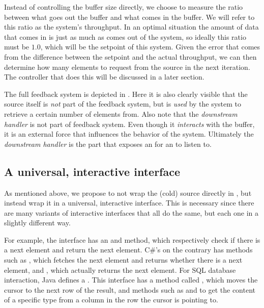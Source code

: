 Instead of controlling the buffer size directly, we choose to measure the ratio between what goes out the buffer and what comes in the buffer. We will refer to this ratio as the system's throughput. In an optimal situation the amount of data that comes in is just as much as comes out of the system, so ideally this ratio must be $1.0$, which will be the setpoint of this system. Given the error that comes from the difference between the setpoint and the actual throughput, we can then determine how many elements to request from the source in the next iteration. The controller that does this will be discussed in a later section.

The full feedback system is depicted in . Here it is also clearly visible that the source itself is \emph{not} part of the feedback system, but is \emph{used} by the system to retrieve a certain number of elements from. Also note that the \textit{downstream handler} is not part of feedback system. Even though it \emph{interacts} with the buffer, it is an external force that influences the behavior of the system. Ultimately the \textit{downstream handler} is the part that exposes an \obs for an \obv to listen to.



\subsection{A universal, interactive interface}
As mentioned above, we propose to not wrap the (cold) source directly in , but instead wrap it in a universal, interactive interface. This is necessary since there are many variants of interactive interfaces that all do the same, but each one in a slightly different way.

For example, the \itr interface has an  and  method, which respectively check if there is a next element and return the next element. C\#'s \ier on the contrary has methods such as , which fetches the next element and returns whether there is a next element, and , which actually returns the next element. For SQL database interaction, Java defines a . This interface has a method called , which moves the cursor to the next row of the result, and methods such as  and  to get the content of a specific type from a column in the row the cursor is pointing to.

